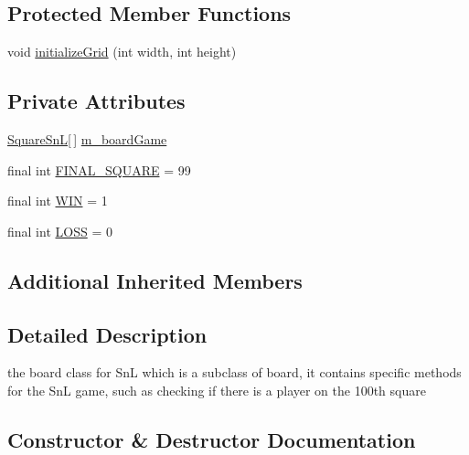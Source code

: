 \subsection*{Protected Member Functions}
\begin{DoxyCompactItemize}
\item 
void \hyperlink{class_board_1_1_board_sn_l_a934454d70accef26911914261147d8f5}{initialize\+Grid} (int width, int height)
\end{DoxyCompactItemize}
\subsection*{Private Attributes}
\begin{DoxyCompactItemize}
\item 
\hyperlink{class_square_1_1_square_sn_l}{Square\+Sn\+L}\mbox{[}$\,$\mbox{]} \hyperlink{class_board_1_1_board_sn_l_a98423adeb63e796de2d496689b4ce8e1}{m\+\_\+board\+Game}
\item 
final int \hyperlink{class_board_1_1_board_sn_l_a133b0d6726fc954ea12a66b4369e3fa6}{F\+I\+N\+A\+L\+\_\+\+S\+Q\+U\+A\+R\+E} = 99
\item 
final int \hyperlink{class_board_1_1_board_sn_l_a9f3b27889e40b337a28438224a5fab4b}{W\+I\+N} = 1
\item 
final int \hyperlink{class_board_1_1_board_sn_l_aa6138411eddcd92ae999cff9fc34acb7}{L\+O\+S\+S} = 0
\end{DoxyCompactItemize}
\subsection*{Additional Inherited Members}


\subsection{Detailed Description}
the board class for Sn\+L which is a subclass of board, it contains specific methods for the Sn\+L game, such as checking if there is a player on the 100th square 

\subsection{Constructor \& Destructor Documentation}
\hypertarget{class_board_1_1_board_sn_l_a03f7b8911496b68ad4de0d1b0939220a}{}
